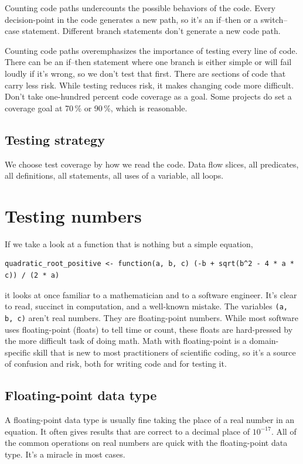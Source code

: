 \documentclass[fleqn,10pt]{olplainarticle}
\begin{document}
Counting code paths undercounts the possible behaviors of the code.
Every decision-point in the code generates a new path, so it's an
if--then or a switch--case statement. Different branch statements
don't generate a new code path.

Counting code paths overemphasizes the importance of testing every
line of code. There can be an if--then statement where one branch
is either simple or will fail loudly if it's wrong, so we don't test
that first.
There are sections of code that carry less risk.
While testing reduces risk, it makes changing code more difficult.
Don't take one-hundred percent code coverage as a goal. Some
projects do set a coverage goal at 70\,\% or 90\,\%, which is reasonable.


\subsection{Testing strategy}

We choose test coverage by how we read the code.
Data flow slices, all predicates, all definitions, all
statements, all uses of a variable, all loops.


\section{Testing numbers}\label{sec:ieee-numbers}

If we take a look at a function that is nothing but a simple equation,
\begin{lstlisting}
quadratic_root_positive <- function(a, b, c) (-b + sqrt(b^2 - 4 * a * c)) / (2 * a)
\end{lstlisting}
it looks at once familiar to a mathematician and to a software engineer.
It's clear to read, succinct in computation, and a well-known mistake.
The variables \lstinline|(a, b, c)| aren't real numbers. They are floating-point
numbers. While most software uses floating-point (floats) to tell time
or count, these floats are hard-pressed by the more difficult task of doing
math. Math with floating-point is a domain-specific skill that is new to
most practitioners of scientific coding, so it's a source of confusion and risk,
both for writing code and for testing it.


\subsection{Floating-point data type}

A floating-point data type is usually fine taking the place of a real number
in an equation. It often gives results that are correct to a decimal place
of $10^{-17}.$ All of the common operations on real numbers are quick with
the floating-point data type. It's a miracle in most cases.
\end{document}
